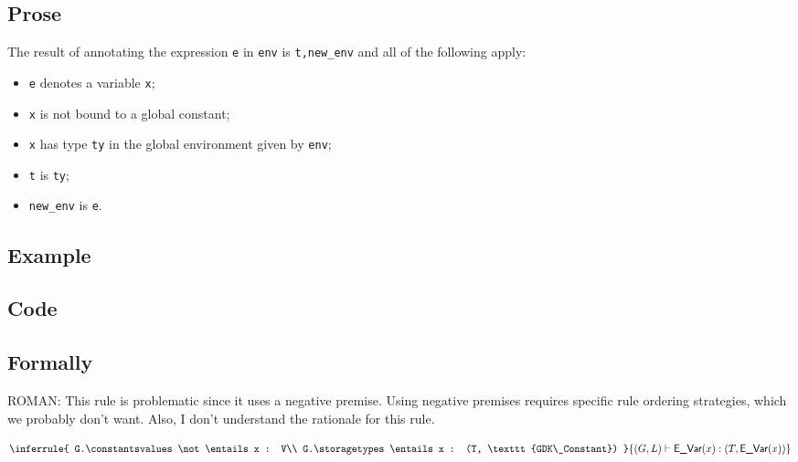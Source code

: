 \documentclass{book}
\begin{document}
  \subsection{Prose}
  The result of annotating the expression \texttt{e} in \texttt{env} is
\texttt{t,new\_env} and all of the following apply:
  \begin{itemize}
  \item \texttt{e} denotes a variable \texttt{x};
  \item \texttt{x} is not bound to a global constant;
  \item \texttt{x} has type \texttt{ty} in the global environment given by \texttt{env};
  \item \texttt{t} is \texttt{ty};
  \item \texttt{new\_env} is \texttt{e}.
  \end{itemize}

  \subsection{Example}

  \subsection{Code}

\begin{emptyformal}
  \subsection{Formally}
  
\begin{emptytodo}
ROMAN: This rule is problematic since it uses a negative premise. Using negative premises requires specific rule ordering strategies, which we probably don't want. Also, I don't understand the rationale for this rule.
\end{emptytodo}
\[
\inferrule{
  G.\constantsvalues \not\entails x : V\\
  G.\storagetypes \entails x : (T, \texttt{GDK\_Constant})
  }
{(G,L) \entails \evar(x) : (T, \evar(x))}
\]

\end{emptyformal}

\end{document}
